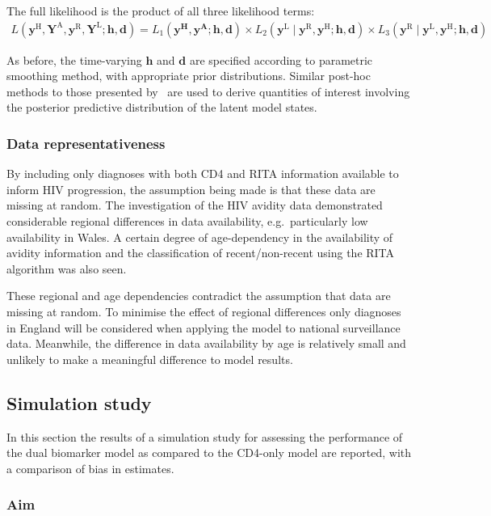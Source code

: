 The full likelihood is the product of all three likelihood terms:
%
\begin{align*}
  L(\bm{y}^\text{H}, \bm{Y}^\text{A},\bm{y}^\text{R}, \bm{Y}^\text{L};\bm{h},\bm{d}) = L_1(\bm{y^\text{H}}, \bm{y^\text{A}};\bm{h},\bm{d}) \times L_2(\bm{y}^\text{L} \mid \bm{y}^\text{R}, \bm{y}^\text{H};\bm{h},\bm{d}) \times L_3(\bm{y}^\text{R} \mid \bm{y}^\text{L}, \bm{y}^\text{H};\bm{h},\bm{d})
\end{align*}

As before, the time-varying $\bm{h}$ and $\bm{d}$ are specified according to parametric smoothing method, with appropriate prior distributions. Similar post-hoc methods to those presented by~\cite{Birrell2012-hw} are used to derive quantities of interest involving the posterior predictive distribution of the latent model states.

\subsubsection{Data representativeness}

By including only diagnoses with both CD4 and RITA information available to inform HIV progression, the assumption being made is that these data are missing at random. The investigation of the HIV avidity data demonstrated considerable regional differences in data availability, e.g.\ particularly low availability in Wales. A certain degree of age-dependency in the availability of avidity information and the classification of recent/non-recent using the RITA algorithm was also seen.

These regional and age dependencies contradict the assumption that data are missing at random. To minimise the effect of regional differences only diagnoses in England will be considered when applying the model to national surveillance data. Meanwhile, the difference in data availability by age is relatively small and unlikely to make a meaningful difference to model results.

\subsection{Simulation study}\label{sec:hiv-simulation}

In this section the results of a simulation study for assessing the performance of the dual biomarker model as compared to the CD4-only model are reported, with a comparison of bias in estimates.

\subsubsection{Aim}

